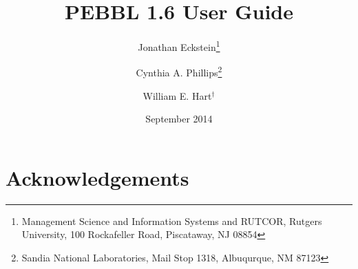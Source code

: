 \documentclass[12pt]{article}
\begin{document}
\title{
PEBBL 1.6 User Guide
}

\author{
Jonathan Eckstein\thanks{
Management Science and Information Systems and RUTCOR, Rutgers University,
100 Rockafeller Road, Piscataway, NJ 08854
}
\and
Cynthia A. Phillips\thanks{
Sandia National Laboratories, Mail Stop 1318, Albuqurque, NM 87123}
\and
William E. Hart$^{\dagger}$
}

\date{September 2014}

\maketitle

\begin{abstract}

\end{abstract}

\newpage

\tableofcontents

\newpage



\section*{Acknowledgements}





\end{document}
